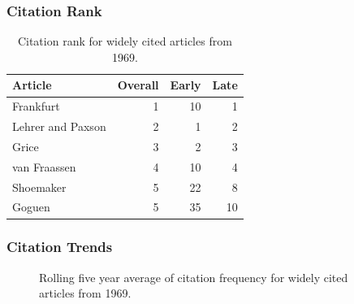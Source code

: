 \documentclass[
  10pt,
  letterpaper,
  DIV=11,
  numbers=noendperiod,
  twoside]{scrartcl}
\begin{document}
\subsubsection*{Citation Rank}\label{sec-rank-1969}

\begin{longtable}[]{@{}lrrr@{}}

\caption{\label{tbl-citation-rank-1969}Citation rank for widely cited
articles from 1969.}

\tabularnewline

\toprule\noalign{}
Article & Overall & Early & Late \\
\midrule\noalign{}
\endhead
\bottomrule\noalign{}
\endlastfoot
Frankfurt & 1 & 10 & 1 \\
Lehrer and Paxson & 2 & 1 & 2 \\
Grice & 3 & 2 & 3 \\
van Fraassen & 4 & 10 & 4 \\
Shoemaker & 5 & 22 & 8 \\
Goguen & 5 & 35 & 10 \\

\end{longtable}

\subsubsection*{Citation Trends}\label{sec-trends-1969}

\begin{figure}


\caption{\label{fig-citation-spaghetti-1969}Rolling five year average of
citation frequency for widely cited articles from 1969.}

\end{figure}%
\end{document}
